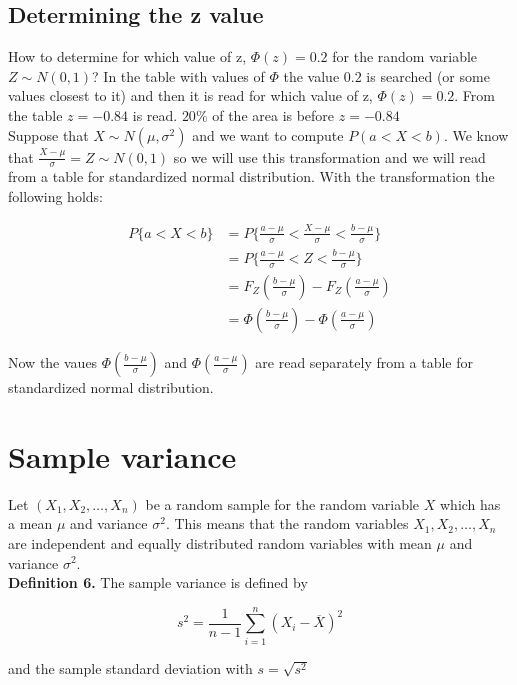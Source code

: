 \documentclass[a4paper, 12pt]{article}
\begin{document}
\subsection{Determining the z value}

How to determine for which value of z, $\Phi(z) = 0.2$ for the random variable
$Z \sim N(0, 1)$? In the table with values of $\Phi$ the value $0.2$ is searched (or some values closest to it) and then it is read for which value of z, $\Phi(z) = 0.2$. From the table $z = -0.84$ is read. $20\%$ of the area is before $z = -0.84$\\

Suppose that $X\sim N(\mu, \sigma^2)$ and we want to compute $P(a<X<b)$. We know that $\displaystyle \frac{X-\mu}{\sigma} = Z \sim N(0,1)$ so we will use this transformation and we will read from a table for standardized normal distribution. With the transformation the following holds:

\begin{align*}
  P\{ a<X<b \}  &= P\{ \frac{a-\mu}{\sigma} < \frac{X-\mu}{\sigma} < \frac{b-\mu}{\sigma} \} \\
  &= P\{ \frac{a-\mu}{\sigma} < Z < \frac{b-\mu}{\sigma} \}\\
  &= F_Z\left( \frac{b-\mu}{\sigma} \right) - F_Z\left( \frac{a-\mu}{\sigma} \right)\\
  &= \Phi\left( \frac{b-\mu}{\sigma} \right) - \Phi\left( \frac{a-\mu}{\sigma} \right)
\end{align*}

Now the vaues $\Phi\left( \frac{b-\mu}{\sigma} \right)$ and $\Phi\left( \frac{a-\mu}{\sigma} \right)$ are read separately from a table for standardized normal distribution.


\newpage
\section{Sample variance}

Let $(X_1, X_2, \dots ,X_n)$ be a random sample for the random variable $X$ which has a mean $\mu$ and variance $\sigma^2$. This means that the random variables $X_1, X_2, \dots,X_n$ are independent and equally distributed random variables with mean $\mu$ and variance $\sigma^2$.\\

\textbf{Definition 6.} The sample variance is defined by

\[ s^2 = \frac{1}{n-1}\sum_{i=1}^{n}(X_i - \overline{X})^2 \]

and the sample standard deviation with $s=\sqrt{s^2}$\\
\end{document}

